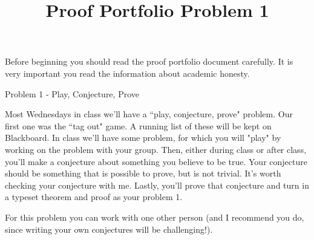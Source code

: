 \documentclass{article}  %
\title{Proof Portfolio Problem 1}
\author{}
\date{}
\begin{document}
\maketitle



Before beginning you should read the proof portfolio document carefully.  It is very important you read the information about academic honesty. 



\begin{center}
	{\Large Problem 1 - Play, Conjecture, Prove}
	\end{center}
	
Most Wednesdays in class we'll have a ``play, conjecture, prove" problem. Our first one was the ``tag out" game. A running list of these will be kept on Blackboard. In class we'll have some problem, for which you will "play" by working on the problem with your group. Then, either during class or after class, you'll make a conjecture about something you believe to be true. Your conjecture should be something that is possible to prove, but is not trivial. It's worth checking your conjecture with me. Lastly, you'll prove that conjecture and turn in a typeset theorem and proof as your problem 1.

For this problem you can work with one other person (and I recommend you do, since writing your own conjectures will be challenging!).
\end{document}
